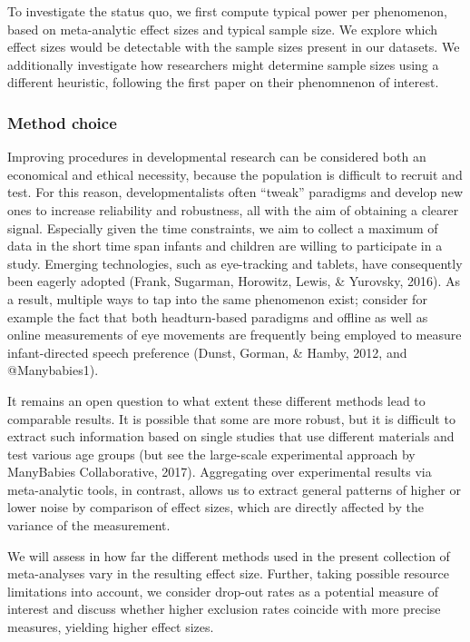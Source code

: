 \documentclass[english,floatsintext,man]{apa6}
\begin{document}
To investigate the status quo, we first compute typical power per
phenomenon, based on meta-analytic effect sizes and typical sample size.
We explore which effect sizes would be detectable with the sample sizes
present in our datasets. We additionally investigate how researchers
might determine sample sizes using a different heuristic, following the
first paper on their phenomnenon of interest.

\subsubsection{Method choice}\label{method-choice}

Improving procedures in developmental research can be considered both an
economical and ethical necessity, because the population is difficult to
recruit and test. For this reason, developmentalists often
\enquote{tweak} paradigms and develop new ones to increase reliability
and robustness, all with the aim of obtaining a clearer signal.
Especially given the time constraints, we aim to collect a maximum of
data in the short time span infants and children are willing to
participate in a study. Emerging technologies, such as eye-tracking and
tablets, have consequently been eagerly adopted (Frank, Sugarman,
Horowitz, Lewis, \& Yurovsky, 2016). As a result, multiple ways to tap
into the same phenomenon exist; consider for example the fact that both
headturn-based paradigms and offline as well as online measurements of
eye movements are frequently being employed to measure infant-directed
speech preference (Dunst, Gorman, \& Hamby, 2012, and @Manybabies1).

It remains an open question to what extent these different methods lead
to comparable results. It is possible that some are more robust, but it
is difficult to extract such information based on single studies that
use different materials and test various age groups (but see the
large-scale experimental approach by ManyBabies Collaborative, 2017).
Aggregating over experimental results via meta-analytic tools, in
contrast, allows us to extract general patterns of higher or lower noise
by comparison of effect sizes, which are directly affected by the
variance of the measurement.

We will assess in how far the different methods used in the present
collection of meta-analyses vary in the resulting effect size. Further,
taking possible resource limitations into account, we consider drop-out
rates as a potential measure of interest and discuss whether higher
exclusion rates coincide with more precise measures, yielding higher
effect sizes.
\end{document}
